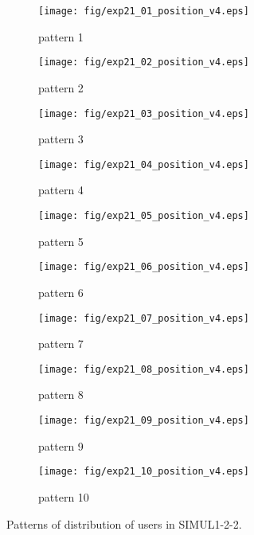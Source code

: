 	\begin{figure}
		\begin{center}
			\begin{subfigure}[b]{0.32\textwidth}
				\texttt{[image: fig/exp21\_01\_position\_v4.eps]}
				\caption{pattern 1}
				\label{figure:simul1_2_2_a}
			\end{subfigure}
			\begin{subfigure}[b]{0.32\textwidth}
				\texttt{[image: fig/exp21\_02\_position\_v4.eps]}
				\caption{pattern 2}
				\label{figure:simul1_2_2_b}
			\end{subfigure}
			\begin{subfigure}[b]{0.32\textwidth}
				\texttt{[image: fig/exp21\_03\_position\_v4.eps]}
				\caption{pattern 3}
				\label{figure:simul1_2_2_c}
			\end{subfigure}
			\begin{subfigure}[b]{0.32\textwidth}
				\texttt{[image: fig/exp21\_04\_position\_v4.eps]}
				\caption{pattern 4}
				\label{figure:simul1_2_2_d}
			\end{subfigure}
			\begin{subfigure}[b]{0.32\textwidth}
				\texttt{[image: fig/exp21\_05\_position\_v4.eps]}
				\caption{pattern 5}
				\label{figure:simul1_2_2_e}
			\end{subfigure}
			\begin{subfigure}[b]{0.32\textwidth}
				\texttt{[image: fig/exp21\_06\_position\_v4.eps]}
				\caption{pattern 6}
				\label{figure:simul1_2_2_f}
			\end{subfigure}
			\begin{subfigure}[b]{0.32\textwidth}
				\texttt{[image: fig/exp21\_07\_position\_v4.eps]}
				\caption{pattern 7}
				\label{figure:simul1_2_2_g}
			\end{subfigure}
			\begin{subfigure}[b]{0.32\textwidth}
				\texttt{[image: fig/exp21\_08\_position\_v4.eps]}
				\caption{pattern 8}
				\label{figure:simul1_2_2_h}
			\end{subfigure}
			\begin{subfigure}[b]{0.32\textwidth}
				\texttt{[image: fig/exp21\_09\_position\_v4.eps]}
				\caption{pattern 9}
				\label{figure:simul1_2_2_i}
			\end{subfigure}
			\begin{subfigure}[b]{0.32\textwidth}
				\texttt{[image: fig/exp21\_10\_position\_v4.eps]}
				\caption{pattern 10}
				\label{figure:simul1_2_2_j}
			\end{subfigure}
			\caption{Patterns of distribution of users in SIMUL1-2-2.}
			\label{figure:simul1_2_2_p}
		\end{center}
	\end{figure}
	
